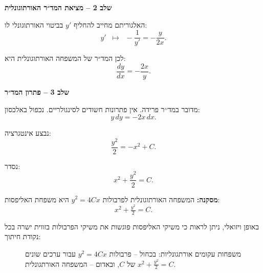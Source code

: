 \documentclass{article}
\numberwithin{equation}{section}
\begin{document}
\textbf{שלב 2 – מציאת המד״ר האורתוגונלית}  

האלגוריתם מחייב להחליף $y'$ בביטוי האורתוגונלי לו:
\[
y' \;\;\longmapsto\;\; -\frac{1}{y'} = -\frac{y}{2x}.
\]

לכן המד״ר של המשפחה האורתוגונלית היא:
\[
\frac{dy}{dx} = -\frac{2x}{y}.
\]

\textbf{שלב 3 – פתרון המד״ר}  

מדובר במד׳׳ר פרידה. אין פתרונות חשודים לסינגולריים.
נכפול באלכסון:
\[
y\,dy = -2x\,dx.
\]

נבצע אינטגרציה:
\[
\frac{y^2}{2} = -x^2 + C.
\]

נסדר:
\[
x^2 + \frac{y^2}{2} = C.
\]

\textbf{מסקנה:}  
המשפחה האורתוגונלית לפרבולות $y^2=4Cx$ היא משפחת האליפסות:
\[
\boxed{x^2 + \tfrac{y^2}{2} = C}.
\]

באופן ויזואלי, ניתן לראות כי משיקי האליפסות פוגשות את משיקי הפרבולות בזווית ישרה בכל נקודת חיתוך:  

\begin{figure}[H]
\centering
{}
\caption{משפחות עקומים אורתגונליות: בכחול – פרבולות $y^2=4Cx$ עבור ערכים שונים של $C$, ובאדום – המשפחה האורתגונלית $x^2+\tfrac{y^2}{2}=C$.}
\label{fig:parabola_orthogonal}
\end{figure}
\end{document}
